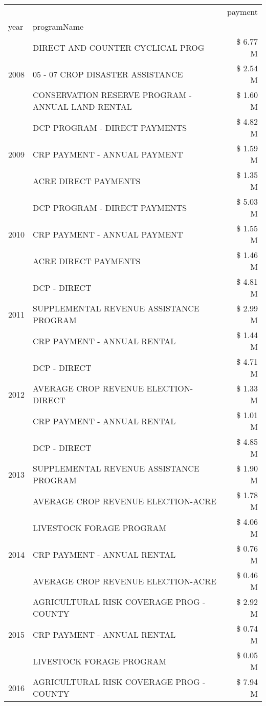 \begin{tabular}{llr}
\toprule
 &  & payment \\
year & programName &  \\
\midrule
\multirow[t]{3}{*}{2008} & DIRECT AND COUNTER CYCLICAL PROG & \$ 6.77 M \\
 & 05 - 07 CROP DISASTER ASSISTANCE & \$ 2.54 M \\
 & CONSERVATION RESERVE PROGRAM - ANNUAL LAND RENTAL & \$ 1.60 M \\
\cline{1-3}
\multirow[t]{3}{*}{2009} & DCP PROGRAM - DIRECT PAYMENTS & \$ 4.82 M \\
 & CRP PAYMENT - ANNUAL PAYMENT & \$ 1.59 M \\
 & ACRE DIRECT PAYMENTS & \$ 1.35 M \\
\cline{1-3}
\multirow[t]{3}{*}{2010} & DCP PROGRAM - DIRECT PAYMENTS & \$ 5.03 M \\
 & CRP PAYMENT - ANNUAL PAYMENT & \$ 1.55 M \\
 & ACRE DIRECT PAYMENTS & \$ 1.46 M \\
\cline{1-3}
\multirow[t]{3}{*}{2011} & DCP - DIRECT & \$ 4.81 M \\
 & SUPPLEMENTAL REVENUE ASSISTANCE PROGRAM & \$ 2.99 M \\
 & CRP PAYMENT - ANNUAL RENTAL & \$ 1.44 M \\
\cline{1-3}
\multirow[t]{3}{*}{2012} & DCP - DIRECT & \$ 4.71 M \\
 & AVERAGE CROP REVENUE ELECTION-DIRECT & \$ 1.33 M \\
 & CRP PAYMENT - ANNUAL RENTAL & \$ 1.01 M \\
\cline{1-3}
\multirow[t]{3}{*}{2013} & DCP - DIRECT & \$ 4.85 M \\
 & SUPPLEMENTAL REVENUE ASSISTANCE PROGRAM & \$ 1.90 M \\
 & AVERAGE CROP REVENUE ELECTION-ACRE & \$ 1.78 M \\
\cline{1-3}
\multirow[t]{3}{*}{2014} & LIVESTOCK FORAGE PROGRAM & \$ 4.06 M \\
 & CRP PAYMENT - ANNUAL RENTAL & \$ 0.76 M \\
 & AVERAGE CROP REVENUE ELECTION-ACRE & \$ 0.46 M \\
\cline{1-3}
\multirow[t]{3}{*}{2015} & AGRICULTURAL RISK COVERAGE PROG - COUNTY & \$ 2.92 M \\
 & CRP PAYMENT - ANNUAL RENTAL & \$ 0.74 M \\
 & LIVESTOCK FORAGE PROGRAM & \$ 0.05 M \\
\cline{1-3}
\multirow[t]{3}{*}{2016} & AGRICULTURAL RISK COVERAGE PROG - COUNTY & \$ 7.94 M \\

\end{tabular}
